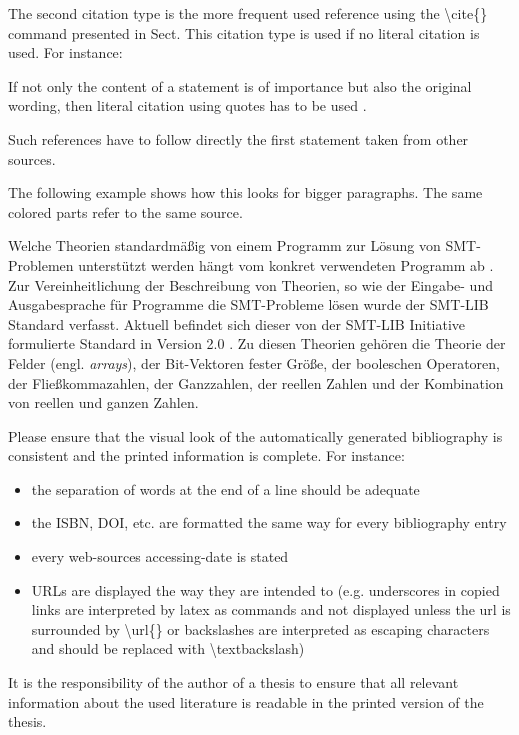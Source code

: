 The second citation type is the more frequent used reference using the \textbackslash cite\{\} command presented in Sect.
This citation type is used if no literal citation is used.
For instance:
\begin{center}
  If not only the content of a statement is of importance but also the original wording, then literal citation using quotes has to be used  .
\end{center}
Such references have to follow directly the first statement taken from other sources.

The following example shows how this looks for bigger paragraphs.
The same colored parts refer to the same source.

\begin{flushleft}
  \textcolor[rgb]{1,0,0}{Welche Theorien standardmäßig von einem Programm zur Lösung von SMT-Problemen unterstützt werden hängt vom konkret verwendeten Programm ab .
    Zur Vereinheitlichung der Beschreibung von Theorien, so wie der Eingabe- und Ausgabesprache für Programme die SMT-Probleme lösen wurde der SMT-LIB Standard verfasst.}
  \textcolor[rgb]{0.2,0.8,0.2}{Aktuell befindet sich dieser von der SMT-LIB Initiative formulierte Standard in Version 2.0 .}
  \textcolor[rgb]{0,0.8,1}{Zu diesen Theorien gehören die Theorie der Felder (engl. \textit{arrays}), der Bit-Vektoren fester Größe, der booleschen Operatoren, der Fließkommazahlen, der Ganzzahlen, der reellen Zahlen und der Kombination von reellen und ganzen Zahlen.}
\end{flushleft}

Please ensure that the visual look of the automatically generated bibliography is consistent and the printed information is complete.
For instance:
\begin{itemize}
  \item the separation of words at the end of a line should be adequate
  \item the ISBN, DOI, etc. are formatted the same way for every bibliography entry
  \item every web-sources accessing-date is stated
  \item URLs are displayed the way they are intended to (e.g. underscores in copied links are interpreted by latex as commands and not displayed unless the url is surrounded by \textbackslash url\{\} or backslashes are interpreted as escaping characters and should be replaced with \textbackslash textbackslash)
\end{itemize}
It is the responsibility of the author of a thesis to ensure that all relevant information about the used literature is readable in the printed version of the thesis.


